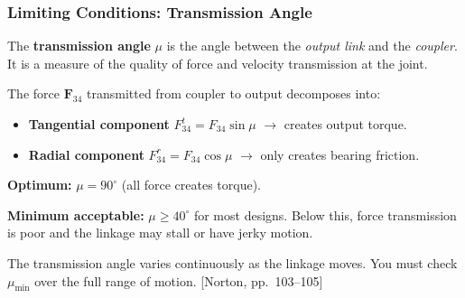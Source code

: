 \documentclass[10pt,aspectratio=43]{beamer}
\newcommand{\pref}[1]{\vfill\hfill{\scriptsize\color{gray}[Norton, pp.~#1]}}
\begin{document}
\begin{frame}
\frametitle{Limiting Conditions: Transmission Angle}

\begin{yellowbox}
The \textbf{transmission angle} $\mu$ is the angle between the \emph{output link} and the \emph{coupler}. It is a measure of the quality of force and velocity transmission at the joint.
\end{yellowbox}

\vspace{4pt}
The force $\mathbf{F}_{34}$ transmitted from coupler to output decomposes into:
\begin{itemize}
  \item \textbf{Tangential component} $F^t_{34} = F_{34}\sin\mu$ $\to$ creates output torque.
  \item \textbf{Radial component} $F^r_{34} = F_{34}\cos\mu$ $\to$ only creates bearing friction.
\end{itemize}

\vspace{4pt}
\begin{redbox}
\textbf{Optimum:} $\mu = 90^\circ$ (all force creates torque).

\textbf{Minimum acceptable:} $\mu \geq 40^\circ$ for most designs. Below this, force transmission is poor and the linkage may stall or have jerky motion.
\end{redbox}

\vspace{4pt}
The transmission angle varies continuously as the linkage moves. You must check $\mu_{\min}$ over the full range of motion.
\pref{103--105}
\end{frame}

\end{document}
